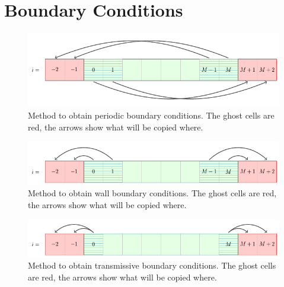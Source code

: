 \newpage
\section{Boundary Conditions}\label{chap:boundary-conditions}





\begin{figure}[htbp]
\includegraphics[width=\textwidth]{./figures/tikz/boundary_periodic.pdf}%
\caption{\label{fig:boundary_periodic}
	Method to obtain periodic boundary conditions.
	The ghost cells are red, the arrows show what will be copied where.
}
\end{figure}



\begin{figure}[htbp]
\includegraphics[width=\textwidth]{./figures/tikz/boundary_wall.pdf}%
\caption{\label{fig:boundary_wall}
	Method to obtain wall boundary conditions.
	The ghost cells are red, the arrows show what will be copied where.
}
\end{figure}



\begin{figure}[htbp]
\includegraphics[width=\textwidth]{./figures/tikz/boundary_transmissive.pdf}%
\caption{\label{fig:boundary_transmissive}
	Method to obtain transmissive boundary conditions.
	The ghost cells are red, the arrows show what will be copied where.
}
\end{figure}



